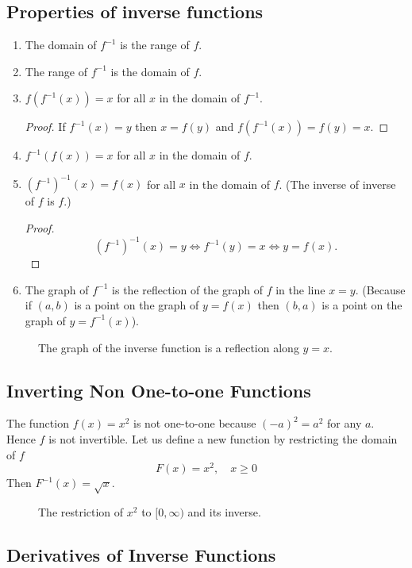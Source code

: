 \documentclass[../main.tex]{subfiles}
\begin{document}
\subsection*{Properties of inverse functions}
\begin{enumerate}
  \item The domain of $f^{-1}$ is the range of $f$.
  \item The range of $f^{-1}$ is the domain of $f$.
  \item $f(f^{-1}(x)) = x$ for all $x$ in the domain of $f^{-1}$.
  \begin{proof}
    If $f^{-1}(x) = y$ then $x = f(y)$ and $f(f^{-1}(x)) = f(y) = x$.
  \end{proof}
  \item $f^{-1}(f(x)) = x$ for all $x$ in the domain of $f$.
  \item $(f^{-1})^{-1}(x) = f(x)$ for all $x$ in the domain of $f$. (The inverse of inverse of $f$ is $f$.)
  \begin{proof}
    \[
      (f^{-1})^{-1}(x) = y \iff f^{-1}(y) = x \iff y = f(x).
    \]
  \end{proof}
  \item The graph of $f^{-1}$ is the reflection of the graph of $f$ in the line $x=y$. (Because if $(a, b)$ is a point on the graph of $y=f(x)$ then $(b, a)$ is a point on the graph of $y = f^{-1}(x)$).
\end{enumerate}
\begin{figure}[H]
  \centering
  
  \caption{The graph of the inverse function is a reflection along $y=x$.}
\end{figure}

\subsection*{Inverting Non One-to-one Functions}
The function $f(x) = x^2$ is not one-to-one because $(-a)^2 = a^2$ for any $a$. Hence $f$ is not invertible. Let us define a new function by restricting the domain of $f$
\[
  F(x) = x^2, \quad x \geq 0
\]
Then $F^{-1}(x) = \sqrt{x}$.
\begin{figure}[H]
  \centering
  
  \caption{The restriction of $x^2$ to $[0, \infty)$ and its inverse.}
\end{figure}

\subsection*{Derivatives of Inverse Functions}
\end{document}
